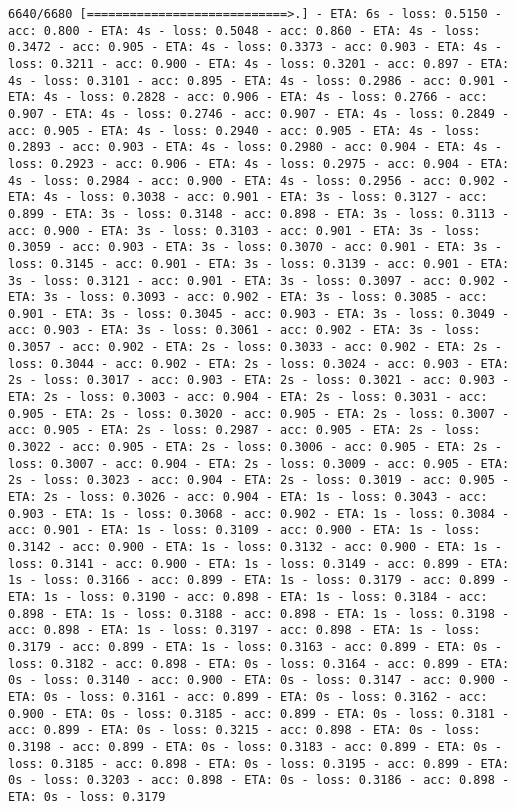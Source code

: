 \documentclass[11pt]{article}
\begin{document}
\begin{Verbatim}[commandchars=\\\{\}]
6640/6680 [============================>.] - ETA: 6s - loss: 0.5150 - acc: 0.800 - ETA: 4s - loss: 0.5048 - acc: 0.860 - ETA: 4s - loss: 0.3472 - acc: 0.905 - ETA: 4s - loss: 0.3373 - acc: 0.903 - ETA: 4s - loss: 0.3211 - acc: 0.900 - ETA: 4s - loss: 0.3201 - acc: 0.897 - ETA: 4s - loss: 0.3101 - acc: 0.895 - ETA: 4s - loss: 0.2986 - acc: 0.901 - ETA: 4s - loss: 0.2828 - acc: 0.906 - ETA: 4s - loss: 0.2766 - acc: 0.907 - ETA: 4s - loss: 0.2746 - acc: 0.907 - ETA: 4s - loss: 0.2849 - acc: 0.905 - ETA: 4s - loss: 0.2940 - acc: 0.905 - ETA: 4s - loss: 0.2893 - acc: 0.903 - ETA: 4s - loss: 0.2980 - acc: 0.904 - ETA: 4s - loss: 0.2923 - acc: 0.906 - ETA: 4s - loss: 0.2975 - acc: 0.904 - ETA: 4s - loss: 0.2984 - acc: 0.900 - ETA: 4s - loss: 0.2956 - acc: 0.902 - ETA: 4s - loss: 0.3038 - acc: 0.901 - ETA: 3s - loss: 0.3127 - acc: 0.899 - ETA: 3s - loss: 0.3148 - acc: 0.898 - ETA: 3s - loss: 0.3113 - acc: 0.900 - ETA: 3s - loss: 0.3103 - acc: 0.901 - ETA: 3s - loss: 0.3059 - acc: 0.903 - ETA: 3s - loss: 0.3070 - acc: 0.901 - ETA: 3s - loss: 0.3145 - acc: 0.901 - ETA: 3s - loss: 0.3139 - acc: 0.901 - ETA: 3s - loss: 0.3121 - acc: 0.901 - ETA: 3s - loss: 0.3097 - acc: 0.902 - ETA: 3s - loss: 0.3093 - acc: 0.902 - ETA: 3s - loss: 0.3085 - acc: 0.901 - ETA: 3s - loss: 0.3045 - acc: 0.903 - ETA: 3s - loss: 0.3049 - acc: 0.903 - ETA: 3s - loss: 0.3061 - acc: 0.902 - ETA: 3s - loss: 0.3057 - acc: 0.902 - ETA: 2s - loss: 0.3033 - acc: 0.902 - ETA: 2s - loss: 0.3044 - acc: 0.902 - ETA: 2s - loss: 0.3024 - acc: 0.903 - ETA: 2s - loss: 0.3017 - acc: 0.903 - ETA: 2s - loss: 0.3021 - acc: 0.903 - ETA: 2s - loss: 0.3003 - acc: 0.904 - ETA: 2s - loss: 0.3031 - acc: 0.905 - ETA: 2s - loss: 0.3020 - acc: 0.905 - ETA: 2s - loss: 0.3007 - acc: 0.905 - ETA: 2s - loss: 0.2987 - acc: 0.905 - ETA: 2s - loss: 0.3022 - acc: 0.905 - ETA: 2s - loss: 0.3006 - acc: 0.905 - ETA: 2s - loss: 0.3007 - acc: 0.904 - ETA: 2s - loss: 0.3009 - acc: 0.905 - ETA: 2s - loss: 0.3023 - acc: 0.904 - ETA: 2s - loss: 0.3019 - acc: 0.905 - ETA: 2s - loss: 0.3026 - acc: 0.904 - ETA: 1s - loss: 0.3043 - acc: 0.903 - ETA: 1s - loss: 0.3068 - acc: 0.902 - ETA: 1s - loss: 0.3084 - acc: 0.901 - ETA: 1s - loss: 0.3109 - acc: 0.900 - ETA: 1s - loss: 0.3142 - acc: 0.900 - ETA: 1s - loss: 0.3132 - acc: 0.900 - ETA: 1s - loss: 0.3141 - acc: 0.900 - ETA: 1s - loss: 0.3149 - acc: 0.899 - ETA: 1s - loss: 0.3166 - acc: 0.899 - ETA: 1s - loss: 0.3179 - acc: 0.899 - ETA: 1s - loss: 0.3190 - acc: 0.898 - ETA: 1s - loss: 0.3184 - acc: 0.898 - ETA: 1s - loss: 0.3188 - acc: 0.898 - ETA: 1s - loss: 0.3198 - acc: 0.898 - ETA: 1s - loss: 0.3197 - acc: 0.898 - ETA: 1s - loss: 0.3179 - acc: 0.899 - ETA: 1s - loss: 0.3163 - acc: 0.899 - ETA: 0s - loss: 0.3182 - acc: 0.898 - ETA: 0s - loss: 0.3164 - acc: 0.899 - ETA: 0s - loss: 0.3140 - acc: 0.900 - ETA: 0s - loss: 0.3147 - acc: 0.900 - ETA: 0s - loss: 0.3161 - acc: 0.899 - ETA: 0s - loss: 0.3162 - acc: 0.900 - ETA: 0s - loss: 0.3185 - acc: 0.899 - ETA: 0s - loss: 0.3181 - acc: 0.899 - ETA: 0s - loss: 0.3215 - acc: 0.898 - ETA: 0s - loss: 0.3198 - acc: 0.899 - ETA: 0s - loss: 0.3183 - acc: 0.899 - ETA: 0s - loss: 0.3185 - acc: 0.898 - ETA: 0s - loss: 0.3195 - acc: 0.899 - ETA: 0s - loss: 0.3203 - acc: 0.898 - ETA: 0s - loss: 0.3186 - acc: 0.898 - ETA: 0s - loss: 0.3179 
\end{Verbatim}
\end{document}
